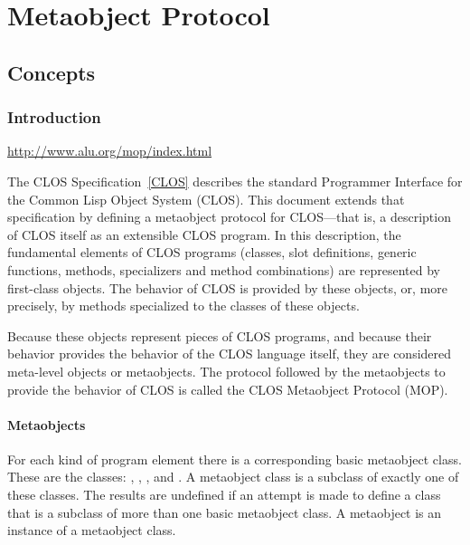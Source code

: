 \clearpage\def\pagestatus{FINAL PROOF}

\chapter{Metaobject Protocol}
\label{METAOBJECT-PROTOCOL}

\section{Concepts}

\subsection{Introduction}

\href{http://www.alu.org/mop/index.html}{http://www.alu.org/mop/index.html}

The CLOS Specification~\ref{CLOS} describes the standard Programmer Interface for the
Common Lisp Object System (CLOS). This document extends that specification by
defining a metaobject protocol for CLOS---that is, a description of CLOS itself
as an extensible CLOS program. In this description, the fundamental elements of
CLOS programs (classes, slot definitions, generic functions, methods,
specializers and method combinations) are represented by first-class
objects. The behavior of CLOS is provided by these objects, or, more precisely,
by methods specialized to the classes of these objects.

Because these objects represent pieces of CLOS programs, and because their
behavior provides the behavior of the CLOS language itself, they are considered
meta-level objects or metaobjects. The protocol followed by the metaobjects to
provide the behavior of CLOS is called the CLOS Metaobject Protocol (MOP). 

\subsubsection{Metaobjects}

For each kind of program element there is a corresponding basic metaobject
class. These are the classes: , ,
,  
and . A metaobject class is a subclass of exactly one of these
classes. The results are undefined if an attempt is made to define a class that
is a subclass of more than one basic metaobject class. A metaobject is an
instance of a metaobject class. 

